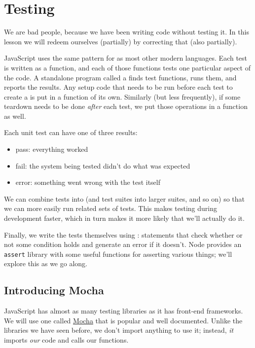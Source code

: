 \chapter{Testing}\label{s:testing}

We are bad people,
because we have been writing code without testing it.
In this lesson we will redeem ourselves (partially)
by correcting that (also partially).

JavaScript uses the same pattern for  as most other modern languages.
Each test is written as a function,
and each of those functions tests one particular aspect of the code.
A standalone program called a 
finds test functions,
runs them,
and reports the results.
Any setup code that needs to be run before each test to create a 
is put in a function of its own.
Similarly (but less frequently),
if some teardown needs to be done \emph{after} each test,
we put those operations in a function as well.

Each unit test can have one of three results:

\begin{itemize}
\item
  pass: everything worked
\item
  fail: the system being tested didn't do what was expected
\item
  error: something went wrong with the test itself
\end{itemize}

We can combine tests into 
(and test suites into larger suites, and so on)
so that we can more easily run related sets of tests.
This makes testing during development faster,
which in turn makes it more likely that we'll actually do it.

Finally,
we write the tests themselves using :
statements that check whether or not some condition holds
and generate an error if it doesn't.
Node provides an \texttt{assert} library with some useful functions for asserting various things;
we'll explore this as we go along.

\section{Introducing Mocha}\label{s:testing-mocha}

JavaScript has almost as many testing libraries as it has front-end frameworks.
We will use one called \href{https://mochajs.org/}{Mocha} that is popular and well documented.
Unlike the libraries we have seen before,
we don't import anything to use it;
instead,
\emph{it} imports \emph{our} code and calls our functions.


